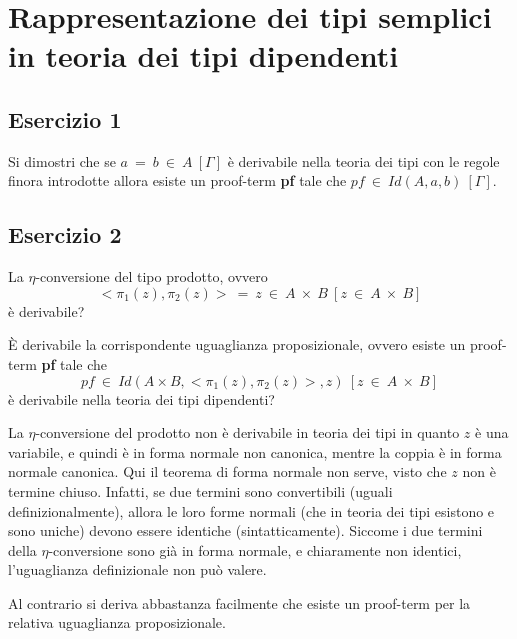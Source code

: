 \section{Rappresentazione dei tipi semplici in teoria dei tipi dipendenti}
\subsection{Esercizio 1}
\begin{thm}
	Si dimostri che se $a~=~b~\in~A~[\Gamma]$ è derivabile nella teoria dei tipi con le regole finora introdotte allora esiste un proof-term \textbf{pf} tale che $pf~\in~Id(A,a,b)~[\Gamma]$.
\end{thm}


\subsection{Esercizio 2}
\begin{thm}
	La $\eta$-conversione del tipo prodotto, ovvero
	\[<\pi_1(z),\pi_2(z)>~=~z~\in~A~\times~B~[z~\in~A~\times~B]\]
	è derivabile?
	
	È derivabile la corrispondente uguaglianza proposizionale, ovvero esiste un proof-term \textbf{pf} tale che
	\[pf~\in~Id(A\times B,<\pi_1(z),\pi_2(z)>,z)~[z~\in~A~\times~B]\]
	è derivabile nella teoria dei tipi dipendenti?
\end{thm}
La $\eta$-conversione del prodotto non è derivabile in teoria dei tipi in quanto $z$ è una variabile, e quindi è in forma normale non canonica, mentre la coppia è in forma normale canonica. Qui il teorema di forma normale non serve, visto che $z$ non è termine chiuso. Infatti, se due termini sono convertibili (uguali definizionalmente), allora le loro forme normali (che in teoria dei tipi esistono e sono uniche) devono essere identiche (sintatticamente). Siccome i due termini della $\eta$-conversione sono già in forma normale, e chiaramente non identici, l’uguaglianza definizionale non può valere.

Al contrario si deriva abbastanza facilmente che esiste un proof-term per la relativa uguaglianza proposizionale.
